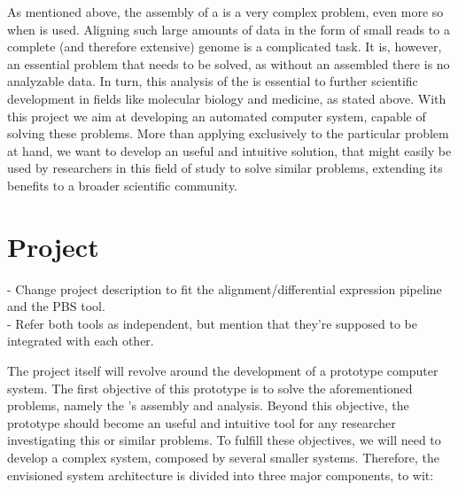 As mentioned above, the assembly of a \trans{} is a very complex problem, even
more so when \rnaseq{} is used. Aligning such large amounts of data in the form
of small reads to a complete (and therefore extensive) genome is a complicated
task. It is, however, an essential problem that needs to be solved, as without
an assembled \trans{} there is no analyzable data. In turn, this analysis of the
\trans{} is essential to further scientific development in fields like
molecular biology and medicine, as stated above. With this project we aim at
developing an automated computer system, capable of solving these problems. More
than applying exclusively to the particular problem at hand, we want to develop
an useful and intuitive solution, that might easily be used by researchers in
this field of study to solve similar problems, extending its benefits to a
broader scientific community.

\section{Project} \label{sec:project}

\begin{Notes}
- Change project description to fit the alignment/differential expression
pipeline and the PBS tool.\\
- Refer both tools as independent, but mention that they're supposed to be
integrated with each other.\\
\end{Notes}

The project itself will revolve around the development of a prototype computer
system. The first objective of this prototype is to solve the aforementioned
problems, namely the \trans 's assembly and analysis. Beyond this objective, the
prototype should become an useful and intuitive tool for any researcher
investigating this or similar problems. To fulfill these objectives, we will
need to develop a complex system, composed by several smaller systems.
Therefore, the envisioned system architecture is divided into three major
components, to wit:

